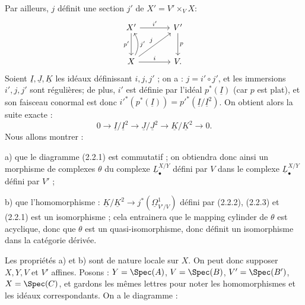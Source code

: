 

Par
ailleurs, $j$ définit une section $j'$ de $X'=V'\times_V X$:
\[
\begin{tikzcd}[column sep=large,row sep=large]
X' \arrow[r,"i'"] \arrow[d,"p'"'] & V' \arrow[d,"p"]\\
X \arrow[r,"i"] \arrow[ur,"j"] \arrow[u,"j'"',bend right] & V .
\end{tikzcd}
\]
Soient $\underline{I},\underline{J},\underline{K}$ les idéaux définissant $i,j,j'$ ; on a : $j=i'\circ j'$, et les immersions $i',j,j'$ sont régulières; de plus, $i'$ est définie par l'idéal $p^*(\underline{I})$ (car $p$ est plat), et son faisceau conormal est donc $i'^*(p^*(\underline{I}))=p'^*(\underline{I}/\underline{I}^2)$. On obtient alors la suite exacte :
\begin{equation}\tag{2.2.3}
0\longrightarrow \underline{I}/\underline{I}^2\longrightarrow \underline{J}/\underline{J}^2\longrightarrow \underline{K}/\underline{K}^2\longrightarrow0.
\end{equation}
Nous allons montrer :

a) que le diagramme (2.2.1) est commutatif ; on obtiendra donc ainsi un morphisme de complexes $\theta$ du complexe $\underline{L}^{X/Y}_\bullet$ défini par $V$ dans le complexe $\underline{L}^{X/Y}_\bullet$ défini par $V'$ ;

b) que l'homomorphisme : $\underline{K}/\underline{K}^2\longrightarrow j^*(\underline{\Omega}^1_{V'/V})$ défini par (2.2.2), (2.2.3) et (2.2.1) est un isomorphisme ; cela entrainera que le mapping cylinder de $\theta$ est acyclique, donc que $\theta$ est un quasi-isomorphisme, donc définit un isomorphisme dans la catégorie dérivée.

Les propriétés a) et b) sont de nature locale sur $X$. On peut donc supposer $X,Y,V$ et $V'$ affines. Posons : $Y=\Spec(A)$, $V=\Spec(B)$, $V'=\Spec(B')$, $X=\Spec(C)$, et gardons les mêmes lettres pour noter les homomorphismes et les idéaux correspondants. On a le diagramme :
